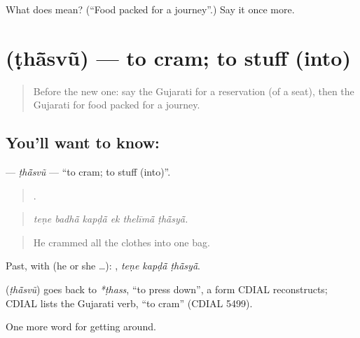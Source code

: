 \begin{tcolorbox}[breakable,colback=teal!4,colframe=teal!35!black,title={Before you move on}]
What does  mean? (\textquotedblleft{}Food packed for a journey\textquotedblright{}.) Say it once more.
\end{tcolorbox}
\section[\texorpdfstring{\gu{ઠાંસવું} (ṭhā̃svũ)}{ઠાંસવું (ṭhā̃svũ)}]{ (ṭhā̃svũ) — to cram; to stuff (into)}

\label{lesson:GU-C395-thasvu}



\begin{quote}
Before the new one: say the Gujarati for a reservation (of a seat), then the Gujarati for food packed for a journey.
\end{quote}

\subsection*{You'll want to know: }
\textbf{} — \emph{ṭhā̃svũ} — \textquotedblleft{}to cram; to stuff (into)\textquotedblright{}.

\begin{quote}
     .
\end{quote}

\begin{quote}
\emph{teṇe badhā̃ kapḍā̃ ek thelīmā̃ ṭhā̃syā̃.}
\end{quote}

\begin{quote}
He crammed all the clothes into one bag.
\end{quote}

Past, with  (he or she …):   , \emph{teṇe kapḍā̃ ṭhā̃syā̃}.

\begin{cousinweb}
\textbf{} (\emph{ṭhā̃svũ}) goes back to \emph{*ṭhass}, \textquotedblleft{}to press down\textquotedblright{}, a form CDIAL reconstructs; CDIAL lists the Gujarati verb, \textquotedblleft{}to cram\textquotedblright{} (CDIAL 5499).
\end{cousinweb}

\begin{grammarlens}[title={What you've built}]
One more word for getting around.
\end{grammarlens}

